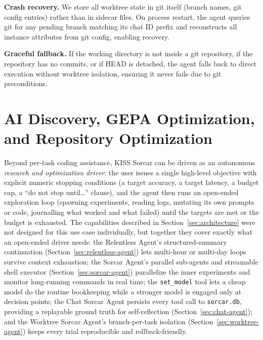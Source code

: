 \documentclass{article}
\begin{document}
\textbf{Crash recovery.}  We store all worktree state in git itself (branch names, git config entries) rather than in sidecar files.  On process restart, the agent queries git for any pending branch matching its chat ID prefix and reconstructs all instance attributes from git config, enabling recovery.

\textbf{Graceful fallback.}  If the working directory is not inside a git repository, if the repository has no commits, or if HEAD is detached, the agent falls back to direct execution without worktree isolation, ensuring it never fails due to git preconditions.

\section{AI Discovery, GEPA Optimization, and Repository Optimization}
\label{sec:long-running}

Beyond per-task coding assistance, KISS Sorcar can be driven as an autonomous \emph{research and optimization driver}: the user issues a single high-level objective with explicit numeric stopping conditions (a target accuracy, a target latency, a budget cap, a ``do not stop until\ldots'' clause), and the agent then runs an open-ended exploration loop (spawning experiments, reading logs, mutating its own prompts or code, journalling what worked and what failed) until the targets are met or the budget is exhausted.  The capabilities described in Section~\ref{sec:architecture} were not designed for this use case individually, but together they cover exactly what an open-ended driver needs: the Relentless Agent's structured-summary continuation (Section~\ref{sec:relentless-agent}) lets multi-hour or multi-day loops survive context exhaustion; the Sorcar Agent's parallel sub-agents and streamable shell executor (Section~\ref{sec:sorcar-agent}) parallelize the inner experiments and monitor long-running commands in real time; the \texttt{set\_model} tool lets a cheap model do the routine bookkeeping while a stronger model is engaged only at decision points; the Chat Sorcar Agent persists every tool call to \texttt{sorcar.db}, providing a replayable ground truth for self-reflection (Section~\ref{sec:chat-agent}); and the Worktree Sorcar Agent's branch-per-task isolation (Section~\ref{sec:worktree-agent}) keeps every trial reproducible and rollback-friendly.
\end{document}
